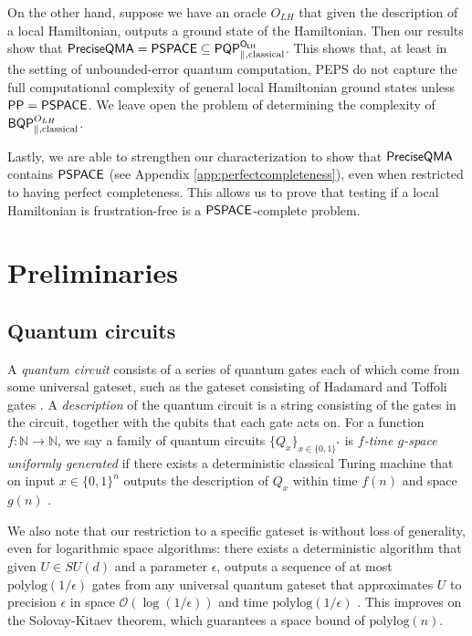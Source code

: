 \documentclass[11pt]{article}
\theoremstyle{definition}
\theoremstyle{remark}
\newcommand\PSPACE{{\sf{PSPACE}}}
\newcommand\PP{\sf{PP}}
\newcommand\BQP{{\sf{BQP}}}
\newcommand\PQP{{\sf{PQP}}}
\newcommand\QMAexp{\sf{PreciseQMA}}
\newcommand\bigoh{\mathcal{O}}
\newcommand{\polylog}{\textrm{polylog}}
\begin{document}
On the other hand, suppose we have an oracle $O_{LH}$ that given the description of a local Hamiltonian, outputs a ground state of the Hamiltonian. Then our results show that $\QMAexp = \PSPACE \subseteq \PQP^{O_{LH}}_{\parallel,\text{classical}}$. This shows that, at least in the setting of unbounded-error quantum computation, PEPS do not capture the full computational complexity of general local Hamiltonian ground states unless $\PP=\PSPACE$. We leave open the problem of determining the complexity of $\BQP^{O_{LH}}_{\parallel,\text{classical}}$.

Lastly, we are able to strengthen our characterization to show that $\QMAexp$ contains $\PSPACE$ (see Appendix \ref{app:perfectcompleteness}), even when restricted to having perfect completeness.  This allows us to prove that testing if a local Hamiltonian is frustration-free is a $\PSPACE$-complete problem.  
 \section{Preliminaries}
\subsection{Quantum circuits}
A \emph{quantum circuit} consists of a series of quantum gates each of which come from some universal gateset, such as the gateset consisting of Hadamard and Toffoli gates \cite{shi}.  A \emph{description} of the quantum circuit is a string consisting of the gates in the circuit, together with the qubits that each gate acts on.
 For a function $f:\mathbb{N}\rightarrow\mathbb{N}$, we say a family of quantum circuits $\{Q_x\}_{x\in\{0,1\}^*}$ is \emph{$f$-time $g$-space uniformly generated} if there exists a deterministic classical Turing machine that on input $x\in\{0,1\}^n$ outputs the description of $Q_x$ within time $f(n)$ and space $g(n)$ \cite{nc00}.  
 
 We also note that our restriction to a specific gateset is without loss of generality, even for logarithmic space algorithms:  there exists a deterministic algorithm that given $U\in SU(d)$ and a parameter $\epsilon$, outputs a sequence of at most $\polylog({1/\epsilon})$ gates from any universal quantum gateset that approximates $U$ to precision $\epsilon$ in space $\bigoh({\log({1/\epsilon})})$ and time $\polylog({1/\epsilon})$ \cite{mw12}.  This improves on the Solovay-Kitaev theorem, which guarantees a space bound of $\polylog(n)$.
\end{document}
